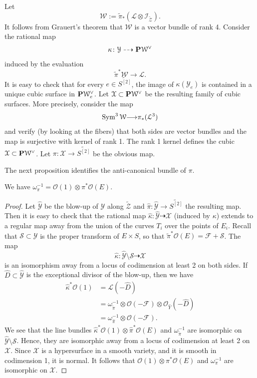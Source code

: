 \documentclass[12pt,reqno]{amsart}
\renewcommand{\to}{{\longrightarrow}}
\numberwithin{equation}{section}
\renewcommand{\O}{\mathcal O}
\begin{document}
Let
\[
\mathcal W := \widetilde \pi_* \left( \mathcal L \otimes \mathcal I_{\widetilde{\mathcal Z}} \right).
\]
It follows from Grauert's theorem that $\mathcal W$ is a vector bundle of rank 4.
Consider the rational map
\[ \kappa \colon \mathcal Y \dashrightarrow \P \mathcal W^\vee\]
induced by the evaluation
\[ \widetilde \pi^* \mathcal W \to \mathcal L.\]
It is easy to check that for every $e \in \widetilde{S^{[2]}}$, the image of $\kappa(\mathcal Y_e)$ is contained in a unique cubic surface in $\P \mathcal W^\vee_e$.
Let $\mathcal X \subset \P \mathcal W^\vee$ be the resulting family of cubic surfaces.
More precisely, consider the map
\[ \Sym^3 \mathcal W \to \pi_*(\mathcal L^3)\]
and verify (by looking at the fibers) that both sides are vector bundles and the map is surjective with kernel of rank 1.
The rank 1 kernel defines the cubic $\mathcal X \subset \P \mathcal W^\vee$.
Let $\pi \colon \mathcal X \to \widetilde{S^{[2]}}$ be the obvious map.

The next proposition identifies the anti-canonical bundle of $\pi$.
\begin{proposition}
  We have $\omega_\pi^{-1} = \O(1) \otimes \pi^*\O(E)$.
\end{proposition}
\begin{proof}
  Let $\widehat {\mathcal Y}$ be the blow-up of $\mathcal Y$ along $\widetilde{\mathcal Z}$ and $\widehat \pi \colon \widehat{\mathcal Y} \to \widetilde{S^{[2]}}$ the resulting map.
  Then it is easy to check that the rational map $\widehat\kappa \colon \widehat {\mathcal Y} \dashrightarrow \mathcal X$ (induced by $\kappa$) extends to a regular map away from the union of the curves $T_i$ over the points of $E_i$.
  Recall that $\mathcal S \subset \mathcal Y$ is the proper transform of $E \times S$, so that $\widetilde \pi^* \O(E) = \mathcal F + \mathcal S$.
  The map
  \[
    \widehat \kappa \colon \widehat {\mathcal Y} \setminus \mathcal S \dashrightarrow \mathcal X
  \]
  is an isomorphism away from a locus of codimension at least 2 on both sides.
  If $\widehat D \subset \widehat {\mathcal Y}$ is the exceptional divisor of the blow-up, then we have
  \begin{align*}
    \widehat \kappa ^* \O(1) &= \mathcal L(-\widehat D) \\
                             &= \omega^{-1}_{\widetilde \pi} \otimes \O(-\mathcal F) \otimes \O_{\widehat Y}(-\widehat D) \\
                             &= \omega_{\widehat \pi}^{-1} \otimes \O(-\mathcal F).
  \end{align*}
  We see that the line bundles $\widehat \kappa^* \O(1) \otimes \widehat \pi^* \O(E)$ and $\omega_{\widetilde \pi}^{-1}$ are isomorphic on $\widehat {\mathcal Y} \setminus \mathcal S$.
  Hence, they are isomorphic away from a locus of codimension at least 2 on $\mathcal X$.
  Since $\mathcal X$ is a hypersurface in a smooth variety, and it is smooth in codimension 1, it is normal.
  It follows that $\O(1) \otimes \pi^* \O(E)$ and $\omega_\pi^{-1}$ are isomorphic on $\mathcal X$.
\end{proof}
\end{document}
